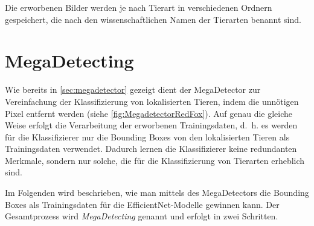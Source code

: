 
Die erworbenen Bilder werden je nach Tierart in verschiedenen Ordnern gespeichert, die nach den wissenschaftlichen Namen der Tierarten benannt sind.

\section{MegaDetecting}

Wie bereits in \autoref{sec:megadetector} gezeigt dient der MegaDetector zur Vereinfachung der Klassifizierung von lokalisierten Tieren, indem die unnötigen Pixel entfernt werden (siehe \autoref{fig:MegadetectorRedFox}). Auf genau die gleiche Weise erfolgt die Verarbeitung der erworbenen Trainingsdaten, d.~h. es werden für die Klassifizierer nur die Bounding Boxes von den lokalisierten Tieren als Trainingsdaten verwendet. Dadurch lernen die Klassifizierer keine redundanten Merkmale, sondern nur solche, die für die Klassifizierung von Tierarten erheblich sind.

Im Folgenden wird beschrieben, wie man mittels des MegaDetectors die Bounding Boxes als Trainingsdaten für die EfficientNet-Modelle gewinnen kann. Der Gesamtprozess wird \emph{MegaDetecting} genannt und erfolgt in zwei Schritten.

